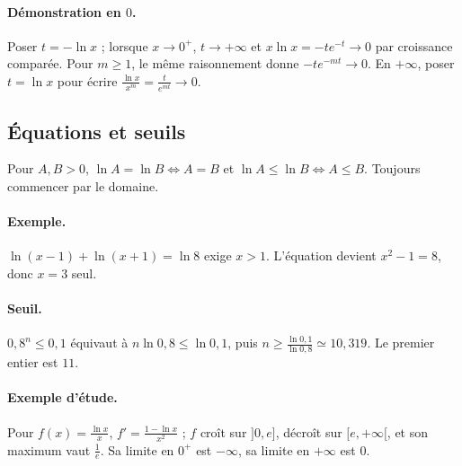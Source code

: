 \paragraph{Démonstration en $0$.} Poser $t=-\ln x$ ; lorsque $x\to0^+$, $t\to+\infty$ et $x\ln x=-te^{-t}\to0$ par croissance comparée. Pour $m\ge1$, le même raisonnement donne $-te^{-mt}\to0$. En $+\infty$, poser $t=\ln x$ pour écrire $\frac{\ln x}{x^m}=\frac{t}{e^{mt}}\to0$.
\subsection{Équations et seuils}
Pour $A,B>0$, $\ln A=\ln B\Leftrightarrow A=B$ et $\ln A\le\ln B\Leftrightarrow A\le B$. Toujours commencer par le domaine.
\paragraph{Exemple.} $\ln(x-1)+\ln(x+1)=\ln8$ exige $x>1$. L'équation devient $x^2-1=8$, donc $x=3$ seul.
\paragraph{Seuil.} $0{,}8^n\le0{,}1$ équivaut à $n\ln0{,}8\le\ln0{,}1$, puis $n\ge\frac{\ln 0{,}1}{\ln 0{,}8}\simeq10{,}319$. Le premier entier est $11$.
\paragraph{Exemple d'étude.} Pour $f(x)=\frac{\ln x}{x}$, $f'=\frac{1-\ln x}{x^2}$ ; $f$ croît sur $]0,e]$, décroît sur $[e,+\infty[$, et son maximum vaut $\frac{1}{e}$. Sa limite en $0^+$ est $-\infty$, sa limite en $+\infty$ est $0$.


\begin{center}\end{center}

